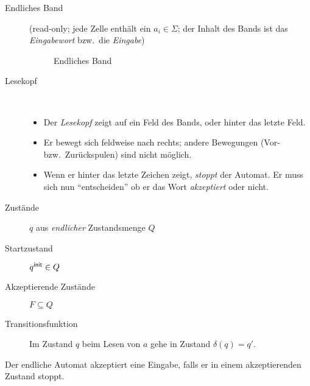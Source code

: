 \begin{description}
\item[Endliches Band] 
(read-only; jede Zelle enthält ein $a_i\in\Sigma$; der Inhalt des Bands ist das \emph{Eingabewort} bzw.\ die \emph{Eingabe})

\begin{figure}[H]\centering
        \caption{Endliches Band}
\end{figure}
\vspace{-1em}
\item[Lesekopf] ~\\
  \vspace{-\baselineskip}
  \begin{itemize}
        \item Der \emph{Lesekopf} zeigt auf ein Feld des Bands, oder hinter das letzte Feld.
        \item Er bewegt sich feldweise nach rechts; andere Bewegungen (Vor- bzw.\ Zurückspulen) sind nicht möglich.
        \item Wenn er hinter das letzte Zeichen zeigt, \emph{stoppt} der Automat.
    Er muss sich nun "`entscheiden"' ob er das Wort \emph{akzeptiert} oder nicht.
  \end{itemize}
\item[Zustände] $q$ aus \emph{endlicher} Zustandsmenge $Q$
\item[Startzustand] $q^\mathsf{init} \in Q$
\item[Akzeptierende Zustände] $F \subseteq Q$ 
\item[Transitionsfunktion] Im Zustand $q$ beim Lesen von $a$ gehe in Zustand $\delta(q) = q'$.
\end{description}
Der endliche Automat akzeptiert eine Eingabe, falls er in einem akzeptierenden Zustand stoppt.


